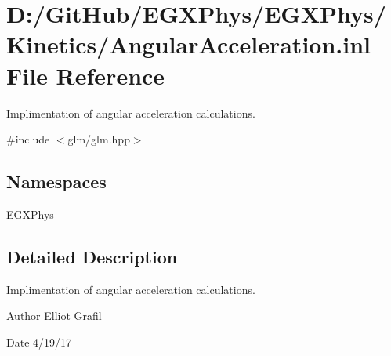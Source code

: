 \hypertarget{_angular_acceleration_8inl}{}\section{D\+:/\+Git\+Hub/\+E\+G\+X\+Phys/\+E\+G\+X\+Phys/\+Kinetics/\+Angular\+Acceleration.inl File Reference}
\label{_angular_acceleration_8inl}


Implimentation of angular acceleration calculations.  


{\ttfamily \#include $<$glm/glm.\+hpp$>$}\newline
\subsection*{Namespaces}
\begin{DoxyCompactItemize}
\item 
 \mbox{\hyperlink{namespace_e_g_x_phys}{E\+G\+X\+Phys}}
\end{DoxyCompactItemize}


\subsection{Detailed Description}
Implimentation of angular acceleration calculations. 

\begin{DoxyAuthor}{Author}
Elliot Grafil 
\end{DoxyAuthor}
\begin{DoxyDate}{Date}
4/19/17 
\end{DoxyDate}
